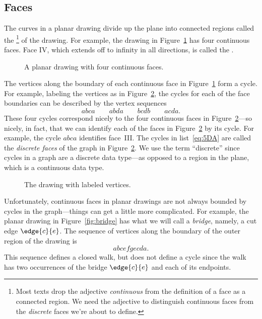 \subsection{Faces}

The curves in a planar drawing divide up the plane into connected
regions called the \footnote{Most texts drop
  the adjective \emph{continuous} from the definition of a face as a
  connected region.  We need the adjective to distinguish continuous
  faces from the \emph{discrete} faces we're about to define.} of the
drawing.  For example, the drawing in
Figure~\ref{fig:continuous-faces} has four continuous faces.  Face IV,
which extends off to infinity in all directions, is called the
.

\begin{figure}


\caption{A planar drawing with four continuous faces.}
\label{fig:continuous-faces}
\end{figure}

The vertices along the boundary of each continuous face in
Figure~\ref{fig:continuous-faces} form a cycle.  For example, labeling the
vertices as in Figure~\ref{fig:continuous-cycles}, the cycles for each of the face
boundaries can be described by the vertex sequences
\begin{equation}\label{eq:5DA}
abca \qquad abda \qquad bcdb \qquad acda.
\end{equation}
These four cycles correspond nicely to the four continuous faces in
Figure~\ref{fig:continuous-cycles}---so nicely, in fact, that we can
identify each of the faces in Figure~\ref{fig:continuous-cycles} by
its cycle.  For example, the cycle $abca$ identifies
face~III\@.  The cycles in list~\ref{eq:5DA} are called the
\emph{discrete faces} of the graph in
Figure~\ref{fig:continuous-cycles}.  We use the term ``discrete''
since cycles in a graph are a discrete data type---as opposed to a
region in the plane, which is a continuous data type.

\begin{figure}


\caption{The drawing with labeled vertices.}
\label{fig:continuous-cycles}
\end{figure}

Unfortunately, continuous faces in planar drawings are not always
bounded by cycles in the graph---things can get a little more
complicated.  For example, the planar drawing in
Figure~\ref{fig:bridge} has what we will call a \emph{bridge}, namely,
a cut edge $\edge{c}{e}$.  The sequence of vertices along the boundary
of the outer region of the drawing is
\[
abcefgecda.
\]
This sequence defines a closed walk, but does not define a cycle since
the walk has two occurrences of the bridge $\edge{c}{e}$ and each of
its endpoints.

